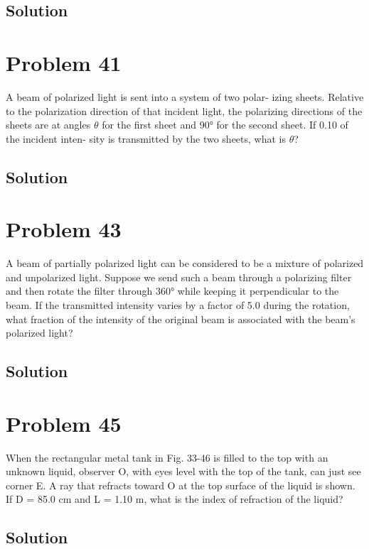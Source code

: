 \documentclass[12pt]{article}
\begin{document}
        \subsection{Solution}

    \pagebreak
    \section{Problem 41}
        A beam of polarized light is sent into a system of two polar-
izing sheets. Relative to the polarization direction of that incident
light, the polarizing directions of the sheets are at angles $\theta$ for the
first sheet and 90\unit{\degree} for the second sheet. If 0.10 of the incident inten-
sity is transmitted by the two sheets, what is $\theta$?

        \subsection{Solution}

    \pagebreak
    \section{Problem 43}
        A beam of partially polarized light can be considered to be
a mixture of polarized and unpolarized light. Suppose we send such
a beam through a polarizing filter and then rotate the filter through
360\unit{\degree} while keeping it perpendicular to the beam. If the transmitted
intensity varies by a factor of 5.0 during the rotation, what fraction
of the intensity of the original beam is associated with the beam’s
polarized light?

        \subsection{Solution}

    \pagebreak
    \section{Problem 45}
        When the rectangular metal
tank in Fig. 33-46 is filled to the top
with an unknown liquid, observer O,
with eyes level with the top of the
tank, can just see corner E. A ray
that refracts toward O at the top
surface of the liquid is shown. If
D = 85.0 cm and L = 1.10 m, what is
the index of refraction of the liquid?

        \subsection{Solution}
\end{document}
